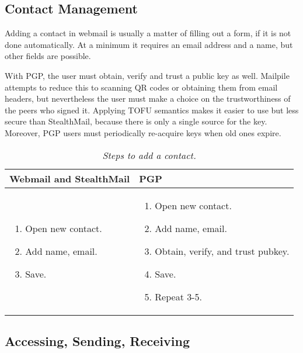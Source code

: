 \subsection{Contact Management}

Adding a contact in webmail is usually a matter of filling out a form, if it is not done automatically.  At a minimum it requires an email address and a name, but other fields are possible.

With PGP, the user must obtain, verify and trust a public key as well.  Mailpile attempts to reduce this to scanning QR codes or obtaining them from email headers, but nevertheless the user must make a choice on the trustworthiness of the peers who signed it.  Applying TOFU semantics makes it easier to use but less secure than StealthMail, because there is only a single source for the key.  Moreover, PGP users must periodically re-acquire keys when old ones expire.

\begin{table}[ht!]
\begin{tabular}{ | L{3.5cm} | L{3.5cm} |}
\hline
\textbf{Webmail and StealthMail} & \textbf{PGP} \\
\hline
\vspace{-3mm}
\begin{enumerate}
  \item{Open new contact.}
  \item{Add name, email.} 
  \item{Save.}
\end{enumerate} 
\vspace{-\topsep} &

\vspace{-3mm}
\begin{enumerate}
  \item{Open new contact.}
  \item{Add name, email.}
  \item{Obtain, verify, and trust pubkey.}
  \item{Save.}
  \item{Repeat 3-5.}
\end{enumerate} 
\vspace{-\topsep} \\

\hline
\end{tabular}
\caption{\it Steps to add a contact.}
\label{tab:account-creation}
\end{table}

\subsection{Accessing, Sending, Receiving}


